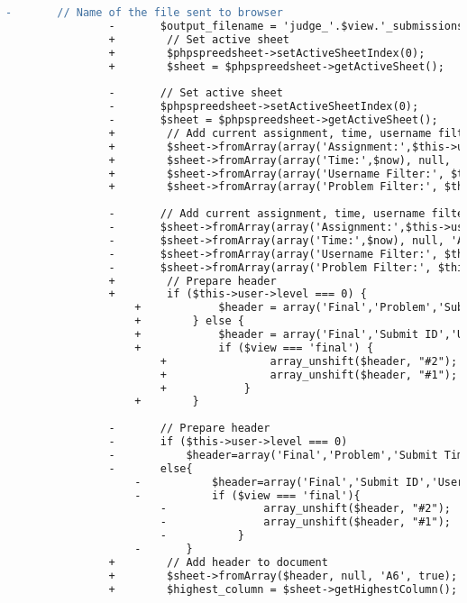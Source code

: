 \begin{lstlisting}[language=diff, caption=Perubahan pada kode Submissions.php]
				-		// Name of the file sent to browser
				-		$output_filename = 'judge_'.$view.'_submissions';
				+        // Set active sheet
				+        $phpspreedsheet->setActiveSheetIndex(0);
				+        $sheet = $phpspreedsheet->getActiveSheet();
				
				-		// Set active sheet
				-		$phpspreedsheet->setActiveSheetIndex(0);
				-		$sheet = $phpspreedsheet->getActiveSheet();
				+        // Add current assignment, time, username filter, and problem filter to document
				+        $sheet->fromArray(array('Assignment:',$this->user->selected_assignment['name']), null, 'A1', true);
				+        $sheet->fromArray(array('Time:',$now), null, 'A2', true);
				+        $sheet->fromArray(array('Username Filter:', $this->filter_user ? $this->filter_user : 'No filter'), null, 'A3', true);
				+        $sheet->fromArray(array('Problem Filter:', $this->filter_problem ? $this->filter_problem : 'No filter'), null, 'A4', true);
				
				-		// Add current assignment, time, username filter, and problem filter to document
				-		$sheet->fromArray(array('Assignment:',$this->user->selected_assignment['name']), null, 'A1', true);
				-		$sheet->fromArray(array('Time:',$now), null, 'A2', true);
				-		$sheet->fromArray(array('Username Filter:', $this->filter_user?$this->filter_user:'No filter'), null, 'A3', true);
				-		$sheet->fromArray(array('Problem Filter:', $this->filter_problem?$this->filter_problem:'No filter'), null, 'A4', true);
				+        // Prepare header
				+        if ($this->user->level === 0) {
					+            $header = array('Final','Problem','Submit Time','Score','Delay (HH:MM)','Coefficient','Final Score','Language','Status');
					+        } else {
					+            $header = array('Final','Submit ID','Username','Name','Problem','Submit Time','Score','Delay (HH:MM)','Coefficient','Final Score','Language','Status');
					+            if ($view === 'final') {
						+                array_unshift($header, "#2");
						+                array_unshift($header, "#1");
						+            }
					+        }
				
				-		// Prepare header
				-		if ($this->user->level === 0)
				-			$header=array('Final','Problem','Submit Time','Score','Delay (HH:MM)','Coefficient','Final Score','Language','Status');
				-		else{
					-			$header=array('Final','Submit ID','Username','Name','Problem','Submit Time','Score','Delay (HH:MM)','Coefficient','Final Score','Language','Status');
					-			if ($view === 'final'){
						-				array_unshift($header, "#2");
						-				array_unshift($header, "#1");
						-			}
					-		}
				+        // Add header to document
				+        $sheet->fromArray($header, null, 'A6', true);
				+        $highest_column = $sheet->getHighestColumn();
				

\end{lstlisting}
